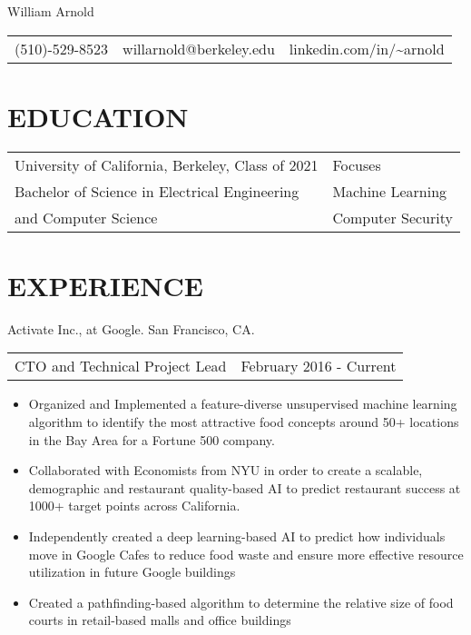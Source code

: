 \documentclass[10pt]{article}
\begin{document}
\centering
{\Large William Arnold}
\centering       

\begin{tabu}{X[l]X[c]X[r]}
(510)-529-8523 & willarnold@berkeley.edu & linkedin.com/in/{\textasciitilde}arnold
\end{tabu} 

\section*{EDUCATION}
		\begin{tabu}{X[l]X[r]}
			   University of California, Berkeley, Class of 2021 & Focuses \\
 			   Bachelor of Science in Electrical Engineering & Machine Learning \\ 
 			   and Computer Science & Computer Security  \\
		\end{tabu}

\justify
\section*{EXPERIENCE}
				Activate Inc., at Google. San Francisco, CA.
				\newline
	                  \hspace*{1em}\begin{tabu}{X[l]X[r]}
	                  	CTO and Technical Project Lead & February 2016 - Current
	                  \end{tabu}	                  		
	                   \begin{itemize} 
	                    		\item[] Organized and Implemented a feature-diverse unsupervised machine learning algorithm to identify the most attractive food concepts around 50+ locations in the Bay Area for a Fortune 500 company.
	                    		\item[] Collaborated with Economists from NYU in order to create a scalable, demographic and restaurant quality-based AI to predict restaurant success at 1000+ target points across California.
	                    		\item[] Independently created a deep learning-based AI to predict how individuals move in Google Cafes to reduce food waste and ensure more effective resource utilization in future Google buildings
	                    		\item[] Created a pathfinding-based algorithm to determine the relative size of food courts in retail-based malls and office buildings
	                    \end{itemize}
	                    		
\end{document}
